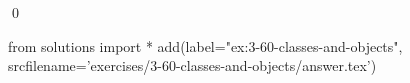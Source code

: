 
\begin{ex}
  \label{ex:3-60-classes-and-objects}
  
  \qed
\end{ex}
\begin{python0}
from solutions import *
add(label="ex:3-60-classes-and-objects",
    srcfilename='exercises/3-60-classes-and-objects/answer.tex')
\end{python0}
